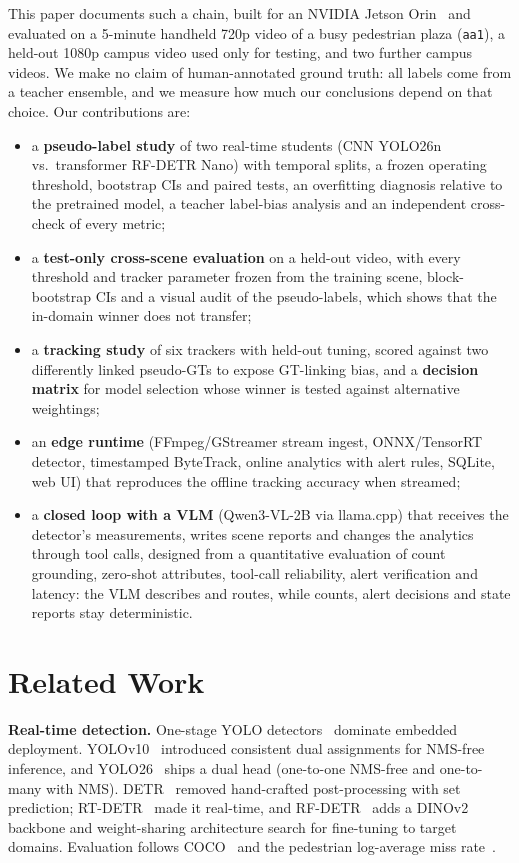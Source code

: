 \documentclass[conference]{IEEEtran}
\newcommand{\yolo}{YOLO26n}
\newcommand{\rfdetr}{RF-DETR Nano}
\begin{document}
This paper documents such a chain, built for an NVIDIA Jetson Orin~\cite{jetsonorin} and evaluated on a 5-minute
handheld 720p video of a busy pedestrian plaza (\texttt{aa1}), a held-out 1080p campus video used only for testing,
and two further campus videos. We make no claim of
human-annotated ground truth: all labels come from a teacher ensemble, and we measure how much our conclusions
depend on that choice. Our contributions are:
\begin{itemize}
\item a \textbf{pseudo-label study} of two real-time students (CNN \yolo{} vs.\ transformer \rfdetr{}) with temporal
splits, a frozen operating threshold, bootstrap CIs and paired tests, an overfitting diagnosis relative to the
pretrained model, a teacher label-bias analysis and an independent cross-check of every metric;
\item a \textbf{test-only cross-scene evaluation} on a held-out video, with every threshold and tracker parameter
frozen from the training scene, block-bootstrap CIs and a visual audit of the pseudo-labels, which shows that the
in-domain winner does not transfer;
\item a \textbf{tracking study} of six trackers with held-out tuning, scored against two differently linked
pseudo-GTs to expose GT-linking bias, and a \textbf{decision matrix} for model selection whose winner is tested
against alternative weightings;
\item an \textbf{edge runtime} (FFmpeg/GStreamer stream ingest, ONNX/TensorRT detector, timestamped ByteTrack,
online analytics with alert rules, SQLite, web UI) that reproduces the offline tracking accuracy when streamed;
\item a \textbf{closed loop with a VLM} (Qwen3-VL-2B via llama.cpp) that receives the detector's measurements,
writes scene reports and changes the analytics through tool calls, designed from a quantitative evaluation of
count grounding, zero-shot attributes, tool-call reliability, alert verification and latency: the VLM
describes and routes, while counts, alert decisions and state reports stay deterministic.
\end{itemize}

\section{Related Work}
\textbf{Real-time detection.} One-stage YOLO detectors~\cite{redmon2016yolo} dominate embedded deployment.
YOLOv10~\cite{wang2024yolov10} introduced consistent dual assignments for NMS-free inference, and
YOLO26~\cite{jocher2026yolo26,ultralytics} ships a dual head (one-to-one NMS-free and one-to-many with NMS).
DETR~\cite{carion2020detr} removed hand-crafted post-processing with set prediction; RT-DETR~\cite{zhao2024rtdetr}
made it real-time, and RF-DETR~\cite{robinson2026rfdetr} adds a DINOv2~\cite{oquab2024dinov2} backbone and
weight-sharing architecture search for fine-tuning to target domains. Evaluation follows COCO~\cite{lin2014coco} and the pedestrian log-average miss rate~\cite{dollar2012pedestrian,zhang2017citypersons}.
\end{document}

